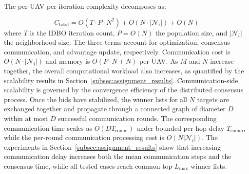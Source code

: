 \documentclass[lettersize,journal]{IEEEtran}
\begin{document}
The per-UAV per-iteration complexity decomposes as:

\begin{equation}
\label{eq:complexity}
C_{\text{total}} = O(T \cdot P \cdot N^2) + O(N \cdot |\mathcal{N}_i|) + O(N)
\end{equation}
where $T$ is the IDBO iteration count, $P = O(N)$ the population size, and $|\mathcal{N}_i|$ the neighborhood size. The three terms account for optimization, consensus communication, and advantage update, respectively. Communication cost is $O(N \cdot |\mathcal{N}_i|)$ and memory is $O(P \cdot N + N)$ per UAV. 
As $M$ and $N$ increase together, the overall computational workload
also increases, as quantified by the scalability results in
Section~\ref{subsec:assignment_results}. Communication-side scalability is
governed by the convergence efficiency of the distributed consensus process.
Once the bids have stabilized, the winner lists for all $N$ targets are
exchanged together and propagate through a connected graph of diameter $D$
within at most $D$ successful communication rounds. The corresponding
communication time scales as $O(DT_{\mathrm{comm}})$ under bounded per-hop
delay $T_{\mathrm{comm}}$, while the per-round communication processing cost
is $O(N|\mathcal{N}_i|)$. The experiments in
Section~\ref{subsec:assignment_results} show that increasing communication
delay increases both the mean communication steps and the consensus time,
while all tested cases reach common top-$L_{\max}$ winner lists.
\end{document}
